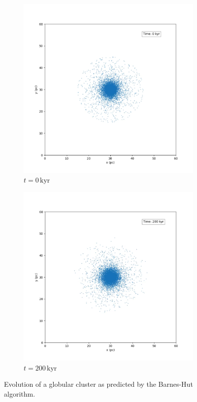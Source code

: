 \begin{figure}[htp]
    \centering
    \begin{subfigure}[b]{0.45\textwidth}
        \centering
        \includegraphics[width=\textwidth]{img/bh-cluster/0kyr.png}
        \caption{$t=0\,\text{kyr}$}
        \label{fig:cluster-evolution-bh-cluster-sub1}
    \end{subfigure}
    \hfill
    \begin{subfigure}[b]{0.45\textwidth}
        \centering
        \includegraphics[width=\textwidth]{img/bh-cluster/200kyr.png}
        \caption{$t=200\,\text{kyr}$}
        \label{fig:cluster-evolution-bh-cluster-sub2}
    \end{subfigure}
    \caption{Evolution of a globular cluster as predicted by the Barnes-Hut algorithm.}
    \label{fig:cluster-evolution-bh}
\end{figure}
